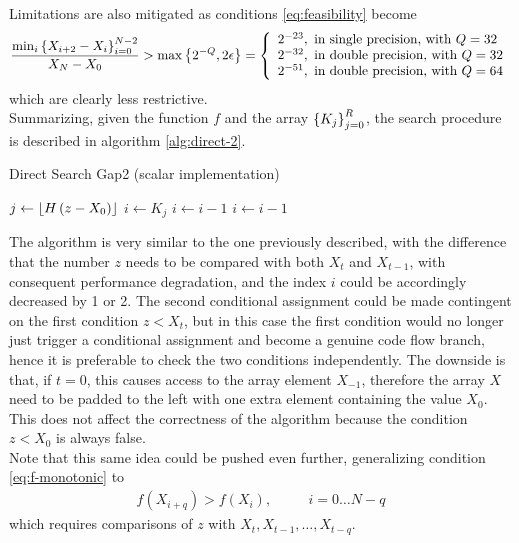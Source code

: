 \documentclass[preprint,1p,times]{elsarticle}
\begin{document}
Limitations are also mitigated as conditions \eqref{eq:feasibility} become
\begin{equation}
\frac{\min_i\left \{ X_{i+2}-X_i \right \}_{i=0}^{N-2}}{X_N-X_0} 
> \max \left \{ 2^{-Q}, 2\epsilon \right \} 
= \left\{ \begin{array}{l}
2^{-23},\text{   in single precision, with }Q=32 \\
2^{-32},\text{   in double precision, with }Q=32 \\
2^{-51},\text{   in double precision, with }Q=64
\end{array}\right.
\end{equation}
which are clearly less restrictive. \\

Summarizing, given the function $f$ and the array $\left \{ K_j \right \}_{j=0}^R$, the search procedure is described in algorithm \ref{alg:direct-2}.
\begin{algorithm}
	\caption{Direct Search Gap2 (scalar implementation)}
	\label{alg:direct-2}
	\begin{algorithmic}
		\State $j \leftarrow \left \lfloor H\, (z-X_0) \right \rfloor$
		\State $i \leftarrow K_j$
			\State $i \leftarrow i-1$ 
		\EndIf
			\State $i \leftarrow i-1$ 
		\EndIf
		\EndFunction
	\end{algorithmic}
\end{algorithm}
The algorithm is very similar to the one previously described, with the difference that the number $z$ needs to be compared with both $X_t$ and $X_{t-1}$, with consequent performance degradation, and the index $i$ could be accordingly decreased by 1 or 2. The second conditional assignment could be made contingent on the first condition $z<X_t$, but in this case the first condition would no longer just trigger a conditional assignment and become a genuine code flow branch, hence it is preferable to check the two conditions independently. The downside is that, if $t=0$, this causes access to the array element $X_{-1}$, therefore the array $X$ need to be padded to the left with one extra element containing the value $X_0$. This does not affect the correctness of the algorithm because the condition $z<X_0$ is always false. \\

Note that this same idea could be pushed even further, generalizing condition \eqref{eq:f-monotonic} to
\begin{align}
\label{eq:f-monotonic-n}
f(X_{i+q}) > f(X_i), &&\quad  i=0 \dots N-q
\end{align}
which requires comparisons of $z$ with $X_t, X_{t-1}, \dots, X_{t-q}$.
\end{document}
